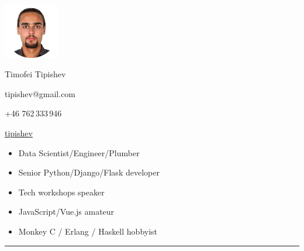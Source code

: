 \documentclass[a4paper,10pt]{article}
\newlength{\cvcolumngapwidth}
\newlength{\cvleftcolumnwidth}
\newlength{\cvrightcolumnwidth}
\newcommand{\cvnamestyle}[1]{{\Large\cvnamefont\textcolor{cvnamecolor}{#1}}}
\newcommand{\cvsectionstyle}[1]{{\normalsize\cvsectionfont\textcolor{cvsectioncolor}{#1}}}
\newlength{\cvafteritemskipamount}
\newlength{\cvaftersectionskipamount}
\newlength{\cvafternameskipamount}
\newlength{\cvafterpersonalinfolineskipamount}
\newcommand{\cvpersonalinfo}[3]{
    \begin{minipage}[t]{\cvleftcolumnwidth}
        \vspace{0mm} %
        \raggedleft #1
    \end{minipage}%
    \hspace{\cvcolumngapwidth}%
    \begin{minipage}[t]{60mm}
        \vspace{0mm} %
        #2
    \end{minipage}
    \begin{minipage}[t]{70mm}
        \vspace{0mm} %
	#3
    \end{minipage}

    \vspace{\cvafteritemskipamount}
}
\newcommand{\cvname}[1]{
    \cvnamestyle{#1}

    \vspace{\cvafternameskipamount}
}
\newcommand{\cvpersonalinfolinewithicon}[3]{
    \raisebox{.5\fontcharht\font`E-.5\height}{\texttt{[image: \#2]}}
    #3

    \vspace{\cvafterpersonalinfolineskipamount}
}
\newcommand{\cvsection}[1]{
    \begin{minipage}[t]{\cvleftcolumnwidth}
        \raggedleft\cvsectionstyle{#1}
    \end{minipage}%
    \hspace{\cvcolumngapwidth}%
    \begin{minipage}[t]{\cvrightcolumnwidth}
        \textcolor{cvrulecolor}{\rule{\cvrightcolumnwidth}{0.3mm}}
    \end{minipage}

    \vspace{\cvaftersectionskipamount}
}
\begin{document}

\cvpersonalinfo{
    \includegraphics[height=24mm]{me-circle.png}

}{
    \cvname{Timofei Tipishev}

    \cvpersonalinfolinewithicon{height=4mm}{070-envelop.pdf}{
        tipishev@gmail.com
    }


    \cvpersonalinfolinewithicon{height=4mm}{067-phone.pdf}{
        +46 762\,333\,946
    }

    \cvpersonalinfolinewithicon{height=4mm}{github.png}{
	    \href{https://github.com/tipishev}{tipishev}
    }
}{
	\begin{itemize}[leftmargin=*]
		\item Data Scientist/Engineer/Plumber
		\item Senior Python/Django/Flask developer
		\item Tech workshops speaker
		\item JavaScript/Vue.js amateur
		\item Monkey C / Erlang / Haskell hobbyist
	\end{itemize}
}



\cvsection{WORK EXPERIENCE}
\end{document}
